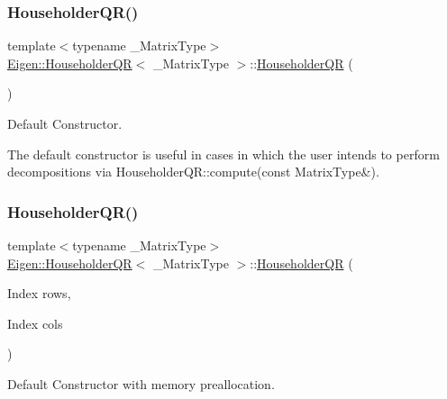 \subsubsection{\texorpdfstring{HouseholderQR()}{HouseholderQR()}\hspace{0.1cm}{\footnotesize\ttfamily [1/4]}}
{\footnotesize\ttfamily template$<$typename \+\_\+\+Matrix\+Type$>$ \\
\mbox{\hyperlink{class_eigen_1_1_householder_q_r}{Eigen\+::\+Householder\+QR}}$<$ \+\_\+\+Matrix\+Type $>$\+::\mbox{\hyperlink{class_eigen_1_1_householder_q_r}{Householder\+QR}} (\begin{DoxyParamCaption}{ }\end{DoxyParamCaption})\hspace{0.3cm}{\ttfamily [inline]}}



Default Constructor. 

The default constructor is useful in cases in which the user intends to perform decompositions via Householder\+Q\+R\+::compute(const Matrix\+Type\&). \mbox{\label{class_eigen_1_1_householder_q_r_a1087457610c53e1574de521a51de0cd3}} 
\subsubsection{\texorpdfstring{HouseholderQR()}{HouseholderQR()}\hspace{0.1cm}{\footnotesize\ttfamily [2/4]}}
{\footnotesize\ttfamily template$<$typename \+\_\+\+Matrix\+Type$>$ \\
\mbox{\hyperlink{class_eigen_1_1_householder_q_r}{Eigen\+::\+Householder\+QR}}$<$ \+\_\+\+Matrix\+Type $>$\+::\mbox{\hyperlink{class_eigen_1_1_householder_q_r}{Householder\+QR}} (\begin{DoxyParamCaption}\item[{Index}]{rows,  }\item[{Index}]{cols }\end{DoxyParamCaption})\hspace{0.3cm}{\ttfamily [inline]}}



Default Constructor with memory preallocation. 

